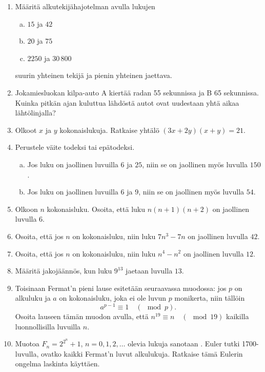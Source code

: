 \begin{enumerate}
\item Määritä alkutekijähajotelman avulla lukujen
\begin{enumerate}[a)]
\item $15$ ja $42$
\item $20$ ja $75$
\item $2250$ ja $30\,800$
\end{enumerate}
suurin yhteinen tekijä ja pienin yhteinen jaettava.

\item
Jokamiesluokan kilpa-auto A kiertää radan 55 sekunnissa ja B
65 sekunnissa. Kuinka pitkän ajan kuluttua lähdöstä autot ovat
uudestaan yhtä aikaa lähtölinjalla?

\item Olkoot $x$ ja $y$ kokonaislukuja. Ratkaise yhtälö $(3x+2y)
(x+y)=21$.

\item Perustele väite todeksi tai epätodeksi.
\begin{enumerate}[a)]
\item Jos luku on jaollinen luvuilla $6$ ja $25$, niin se on
jaollinen myös luvulla $150$.
\item Jos luku on jaollinen luvuilla $6$ ja $9$, niin se on
jaollinen myös luvulla $54$.
\end{enumerate}

\item Olkoon $n$ kokonaisluku. Osoita, että luku $n(n+1)(n+2)$ on
jaollinen luvulla $6$.

\item Osoita, että jos $n$ on kokonaisluku, niin luku $7n^3 - 7n$
on jaollinen luvulla $42$.

\item Osoita, että jos $n$ on kokonaisluku, niin luku $n^4 - n^2$
on jaollinen luvulla $12$.

\item
Määritä jakojäännös, kun luku $9^{13}$ jaetaan luvulla $13$.

\item Toisinaan Fermat'n pieni lause esitetään seuraavassa
muodossa:
jos $p$ on alkuluku ja $a$ on kokonaisluku, joka ei ole
luvun $p$ monikerta, niin tällöin
\[
a^{p-1}\equiv 1\quad (\mod p).
\]
Osoita lauseen tämän muodon avulla, että $n^{19}\equiv n \quad
(\mod 19)$ kaikilla luonnollisilla luvuilla $n$.

\item
Muotoa $F_n = 2^{2^n}+1$, $n=0, 1, 2, \ldots$ olevia lukuja sanotaan
. Euler tutki 1700-luvulla, ovatko kaikki
Fermat'n luvut alkulukuja. Ratkaise tämä Eulerin ongelma laskinta
käyttäen.


\end{enumerate}
